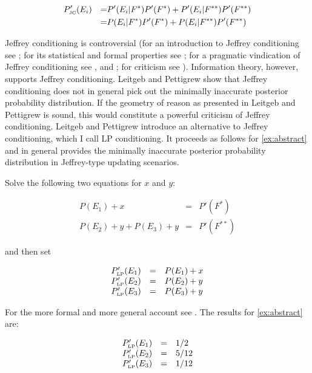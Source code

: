 \documentclass[smallextended]{svjour3}       %
\begin{document}
\begin{align}
  \label{eq:jc}
  &P'_{\mbox{\tiny JC}}(E_{i})&=&P'(E_{i}|F^{*})P'(F^{*})+P'(E_{i}|F^{**})P'(F^{**})\notag \\
  &&=&P(E_{i}|F^{*})P'(F^{*})+P(E_{i}|F^{**})P'(F^{**})
\end{align}

Jeffrey conditioning is controversial (for an introduction to Jeffrey
conditioning see ; for its statistical and
formal properties see ; for a pragmatic
vindication of Jeffrey conditioning see , and
; for criticism see
). Information theory, however, supports
Jeffrey conditioning. Leitgeb and Pettigrew show that Jeffrey
conditioning does not in general pick out the minimally inaccurate
posterior probability distribution. If the geometry of reason as
presented in Leitgeb and Pettigrew is sound, this would constitute a
powerful criticism of Jeffrey conditioning. Leitgeb and Pettigrew
introduce an alternative to Jeffrey conditioning, which I call LP
conditioning. It proceeds as follows for {\xample} \ref{ex:abstract}
and in general provides the minimally inaccurate posterior probability
distribution in Jeffrey-type updating scenarios.

Solve the following two equations for $x$ and $y$:

\begin{equation}
  \label{eq:lpce}
  \begin{array}{rcl}
    P(E_{1})+x&=&P'(F^{*}) \\
    P(E_{2})+y+P(E_{3})+y&=&P'(F^{**})
  \end{array}
\end{equation}

and then set

\begin{equation}
  \label{eq:lpcf}
  \begin{array}{rcl}
    P'_{\mbox{\tiny LP}}(E_{1})&=&P(E_{1})+x \\
    P'_{\mbox{\tiny LP}}(E_{2})&=&P(E_{2})+y \\
    P'_{\mbox{\tiny LP}}(E_{3})&=&P(E_{3})+y
  \end{array}
\end{equation}

For the more formal and more general account see
. The results for {\xample}
\ref{ex:abstract} are:

\begin{equation}
  \label{eq:lpcres}
  \begin{array}{rcl}
    P'_{\mbox{\tiny LP}}(E_{1})&=&1/2 \\
    P'_{\mbox{\tiny LP}}(E_{2})&=&5/12 \\
    P'_{\mbox{\tiny LP}}(E_{3})&=&1/12
  \end{array}
\end{equation}
\end{document}
